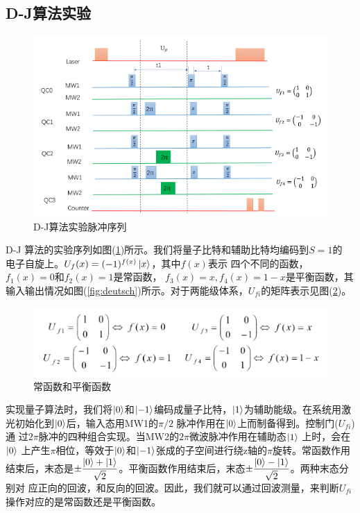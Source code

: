 \documentclass[a4paper]{article}
\begin{document}
\subsection{D-J算法实验}
\begin{figure}[H]
	\centering
	\includegraphics[width=0.9\linewidth]{fig/dj.jpg}
	\caption{D-J算法实验脉冲序列}
	\label{fig:dj}
\end{figure}
D-J 算法的实验序列如图(\ref{fig:dj})所示。我们将量子比特和辅助比特均编码到$ S = 1  $的
电子自旋上。$ U_f (x) = (-1)^{f(x)}\ket{x} $，其中$ f(x)  $表示
四个不同的函数， $ f_1(x) = 0  $和$ f_2(x) = 1  $是常函数， $ f_3(x) =x, f_4(x) = 1-x $是平衡函数，其输入输出情况如图(\ref{fig:deutsch})所示。对于两能级体系，$ U_{f i}$的矩阵表示见图(\ref{fig:djf})。
\begin{figure}[H]
	\centering
	\includegraphics[width=0.7\linewidth]{fig/djf.jpg}
	\caption{常函数和平衡函数}
	\label{fig:djf}
\end{figure}

实现量子算法时，我们将$ \ket{0} $和$ \ket{-1} $编码成量子比特，$ \ket{1} $为辅助能级。在系统用激光初始化到$ \ket{0} $后，输入态用MW1的$ \pi/2 $
脉冲作用在$ \ket{0} $上而制备得到。控制门($ U_{f i} $)通
过$ 2\pi $脉冲的四种组合实现。当MW2的$ 2\pi $微波脉冲作用在辅助态$ \ket{1} $ 上时，会在$ \ket{0} $
上产生$ \pi $相位，等效于$ \ket{0} $和$ \ket{-1} $张成的子空间进行绕z轴的$ \pi $旋转。常函数作用结束后，末态是$ \pm\dfrac{\ket{0}+\ket{1}}{\sqrt{2}} $。平衡函数作用结束后，末态$ \pm\dfrac{\ket{0}-\ket{1}}{\sqrt{2}} $。两种末态分别对
应正向的回波，和反向的回波。因此，我们就可以通过回波测量，来判断$ U_{f i } $操作对应的是常函数还是平衡函数。
\end{document}
